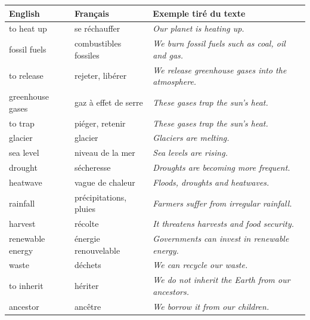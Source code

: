 \documentclass[11pt]{article}
\newcommand{\eng}[1]{\ifmmode\text{\textit{#1}}\else\begingroup\selectlanguage{english}\itshape #1\endgroup\fi}
\begin{document}
\begin{center}
\begin{tabularx}{\linewidth}{|l|l|X|}
\hline
\rowcolor{popblueL} \textbf{English} & \textbf{Français} & \textbf{Exemple tiré du texte} \\
\hline
to heat up & se réchauffer & \eng{Our planet is heating up.} \\
\hline
fossil fuels & combustibles fossiles & \eng{We burn fossil fuels such as coal, oil and gas.} \\
\hline
to release & rejeter, libérer & \eng{We release greenhouse gases into the atmosphere.} \\
\hline
greenhouse gases & gaz à effet de serre & \eng{These gases trap the sun's heat.} \\
\hline
to trap & piéger, retenir & \eng{These gases trap the sun's heat.} \\
\hline
glacier & glacier & \eng{Glaciers are melting.} \\
\hline
sea level & niveau de la mer & \eng{Sea levels are rising.} \\
\hline
drought & sécheresse & \eng{Droughts are becoming more frequent.} \\
\hline
heatwave & vague de chaleur & \eng{Floods, droughts and heatwaves.} \\
\hline
rainfall & précipitations, pluies & \eng{Farmers suffer from irregular rainfall.} \\
\hline
harvest & récolte & \eng{It threatens harvests and food security.} \\
\hline
renewable energy & énergie renouvelable & \eng{Governments can invest in renewable energy.} \\
\hline
waste & déchets & \eng{We can recycle our waste.} \\
\hline
to inherit & hériter & \eng{We do not inherit the Earth from our ancestors.} \\
\hline
ancestor & ancêtre & \eng{We borrow it from our children.} \\
\hline
\end{tabularx}
\end{center}
\end{document}
